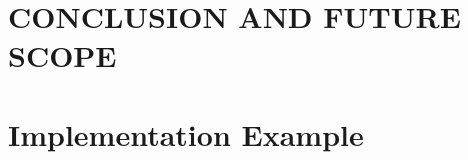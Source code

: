 \documentclass[12pt]{report}
\begin{document}
\chapter{CONCLUSION AND FUTURE SCOPE}




%

\appendix
\chapter{Implementation Example}

 

\cite{gitkey}
\cite{latexkey}
\cite{doxygenkey}
\cite{blog}
\end{document}
